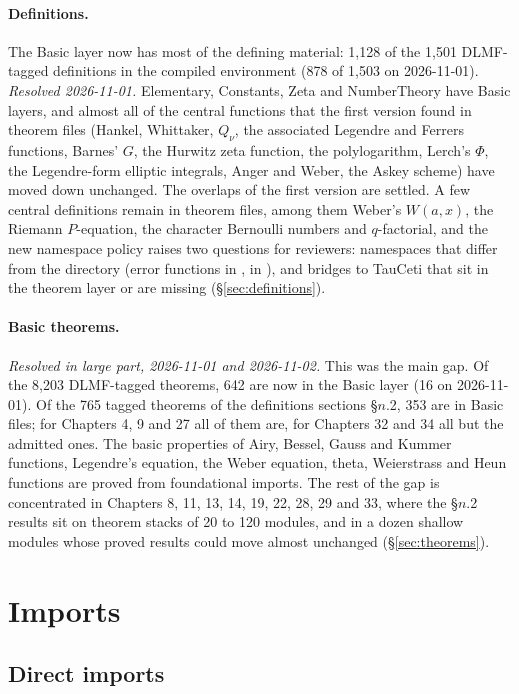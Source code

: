 \documentclass[11pt,a4paper]{article}
\newcommand{\resolved}[1]{\textit{Resolved #1.}}
\begin{document}
\paragraph{Definitions.} The Basic layer now has most of the defining material: 1{,}128 of the
1{,}501 DLMF-tagged definitions in the compiled environment (878 of 1{,}503 on 2026-11-01).
\resolved{2026-11-01} Elementary, Constants, Zeta and NumberTheory have Basic layers, and almost
all of the central functions that the first version found in theorem files (Hankel, Whittaker,
\(Q_\nu\), the associated Legendre and Ferrers functions, Barnes' \(G\), the Hurwitz zeta
function, the polylogarithm, Lerch's \(\Phi\), the Legendre-form elliptic integrals, Anger and
Weber, the Askey scheme) have moved down unchanged. The overlaps of the first version are
settled. A few central definitions remain in theorem files, among them Weber's \(W(a,x)\), the
Riemann \(P\)-equation, the character Bernoulli numbers and \(q\)-factorial, and the new
namespace policy raises two questions for reviewers: namespaces that differ from the directory
(error functions in ,  in ), and bridges
to TauCeti that sit in the theorem layer or are missing (\S\ref{sec:definitions}).

\paragraph{Basic theorems.} \resolved{in large part, 2026-11-01 and 2026-11-02} This was the
main gap. Of the 8{,}203 DLMF-tagged theorems, 642 are now in the Basic layer (16 on
2026-11-01). Of the 765 tagged theorems of the definitions sections \S\(n\).2, 353 are in Basic
files; for Chapters 4, 9 and 27 all of them are, for Chapters 32 and 34 all but the admitted
ones. The basic properties of Airy, Bessel, Gauss and Kummer functions, Legendre's
equation, the Weber equation, theta, Weierstrass and Heun functions are proved from foundational
imports. The rest of the gap is concentrated in Chapters 8, 11, 13, 14, 19, 22, 28, 29 and 33,
where the \S\(n\).2 results sit on theorem stacks of 20 to 120 modules, and in a dozen shallow
modules whose proved results could move almost unchanged (\S\ref{sec:theorems}).

\section{Imports}\label{sec:imports}

\subsection{Direct imports}
\end{document}
